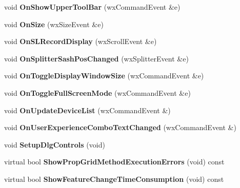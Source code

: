 \begin{DoxyCompactItemize}
\item 
\hypertarget{class_prop_view_frame_aaaa58f108586098138fa00eaab190f46}{void {\bfseries On\+Show\+Upper\+Tool\+Bar} (wx\+Command\+Event \&e)}\label{class_prop_view_frame_aaaa58f108586098138fa00eaab190f46}

\item 
\hypertarget{class_prop_view_frame_a4c2c57ff57beb71d5446ec4f63a2fb80}{void {\bfseries On\+Size} (wx\+Size\+Event \&e)}\label{class_prop_view_frame_a4c2c57ff57beb71d5446ec4f63a2fb80}

\item 
\hypertarget{class_prop_view_frame_a3b575a724320e51b9115197dd4cd212a}{void {\bfseries On\+S\+L\+Record\+Display} (wx\+Scroll\+Event \&e)}\label{class_prop_view_frame_a3b575a724320e51b9115197dd4cd212a}

\item 
\hypertarget{class_prop_view_frame_a2e323126192c8b790e23564f8349f06b}{void {\bfseries On\+Splitter\+Sash\+Pos\+Changed} (wx\+Splitter\+Event \&e)}\label{class_prop_view_frame_a2e323126192c8b790e23564f8349f06b}

\item 
\hypertarget{class_prop_view_frame_ad32138c3aa45e3f3a4655164fbb9bd75}{void {\bfseries On\+Toggle\+Display\+Window\+Size} (wx\+Command\+Event \&e)}\label{class_prop_view_frame_ad32138c3aa45e3f3a4655164fbb9bd75}

\item 
\hypertarget{class_prop_view_frame_a6704edf12d0571b28b7f104ee8dca07f}{void {\bfseries On\+Toggle\+Full\+Screen\+Mode} (wx\+Command\+Event \&e)}\label{class_prop_view_frame_a6704edf12d0571b28b7f104ee8dca07f}

\item 
\hypertarget{class_prop_view_frame_aa231f12dd2f8980ab1d3a8c990890105}{void {\bfseries On\+Update\+Device\+List} (wx\+Command\+Event \&)}\label{class_prop_view_frame_aa231f12dd2f8980ab1d3a8c990890105}

\item 
\hypertarget{class_prop_view_frame_a754b55b15c204cac2d8f96b9c7bf8115}{void {\bfseries On\+User\+Experience\+Combo\+Text\+Changed} (wx\+Command\+Event \&)}\label{class_prop_view_frame_a754b55b15c204cac2d8f96b9c7bf8115}

\item 
\hypertarget{class_prop_view_frame_a4548b9c5227f7df0252359338a165d4b}{void {\bfseries Setup\+Dlg\+Controls} (void)}\label{class_prop_view_frame_a4548b9c5227f7df0252359338a165d4b}

\item 
\hypertarget{class_prop_view_frame_ac313f8ba6b32c4c4e6c1e0e06f59f9c4}{virtual bool {\bfseries Show\+Prop\+Grid\+Method\+Execution\+Errors} (void) const }\label{class_prop_view_frame_ac313f8ba6b32c4c4e6c1e0e06f59f9c4}

\item 
\hypertarget{class_prop_view_frame_ab4a710ae941bf1d31bd653f9803a6b13}{virtual bool {\bfseries Show\+Feature\+Change\+Time\+Consumption} (void) const }\label{class_prop_view_frame_ab4a710ae941bf1d31bd653f9803a6b13}

\end{DoxyCompactItemize}
